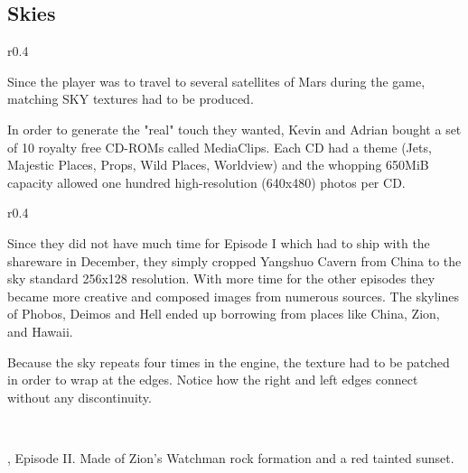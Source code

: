 \subsection{Skies}
\begin{wrapfigure}[7]{r}{0.4\textwidth}
\centering
{}
\end{wrapfigure}
Since the player was to travel to several satellites of Mars during the game, matching SKY textures had to be produced.\\
\par In order to generate the "real" touch they wanted, Kevin and Adrian bought a set of 10 royalty free CD-ROMs called MediaClips. Each CD had a theme (Jets, Majestic Places, Props, Wild Places, Worldview) and the whopping 650MiB capacity allowed one hundred high-resolution (640x480) photos per CD.\\
\par 

\begin{wrapfigure}[7]{r}{0.4\textwidth}
\centering
{}
\end{wrapfigure}

Since they did not have much time for Episode I which had to ship with the shareware in December, they simply cropped Yangshuo Cavern from China to the sky standard 256x128 resolution.  With more time for the other episodes they became more creative and composed images from numerous sources. The skylines of Phobos, Deimos and Hell ended up borrowing from places like China, Zion, and Hawaii. \\
\par

Because the sky repeats four times in the engine, the texture had to be patched in order to wrap at the edges. Notice how the right and left edges connect without any discontinuity.\\
\par
{}\\
\par
{}





\begin{minipage}{\textwidth}
\par
\doom{}, Episode II. Made of Zion's Watchman rock formation and a red tainted sunset.\\
\par
{}
\end{minipage}






